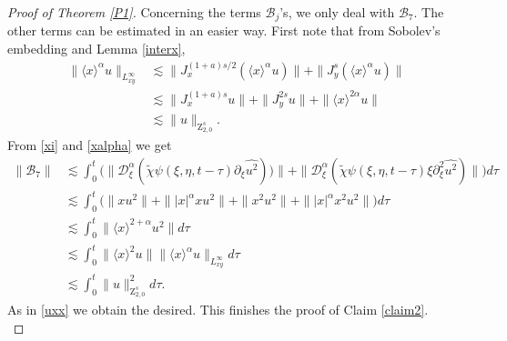 \documentclass[reqno]{amsart}
\newcommand{\les}{\lesssim}
\newcommand{\lanx}{\langle x \rangle}
\newcommand{\ti}{\tilde {\chi}}
\newcommand{\Dta}{\mathcal{D}^{\alpha}_\xi}
\newcommand{\p}{\partial}
\numberwithin{equation}{section}
\begin{document}
\begin{proof}[Proof of Theorem \ref{P1}]
Concerning the terms $\mathcal {B}_j$'s, we only deal with $\mathcal B_7$. The other terms can be estimated in an easier way. First note that from Sobolev's embedding and Lemma \ref{interx},
\begin{equation}
\begin{split}\label{xalpha}
\|\lanx^\alpha u\|_{L^\infty_{xy}}&\les \|J_x^{(1+a)s/2}(\lanx^\alpha u)\|+\|J_y^{s}(\lanx^\alpha u)\|\\
&\les \|J_x^{(1+a)s}u\|+\|J_y^{2s}u\|+\|\lanx^{2\alpha}u\|\\
&\les \|u\|_{\mathrm{Z}_{2,0}^s }.
\end{split}
\end{equation}
From \eqref{xi} and \eqref{xalpha} we get
\begin{equation*}
\begin{split}
\|\mathcal {B}_7\|&\les \int_0^t\Big(\|\Dta (\ti\psi(\xi,\eta, t-\tau)\p_\xi \widehat{u^2}))\|+\|\Dta (\ti\psi(\xi,\eta, t-\tau)\xi\p_\xi^2 \widehat{u^2})\|\Big)d\tau\\
&\les \int_0^t\big(\|x u^2\|+\||x|^\alpha xu^2\|+\|x^2 u^2\|+\||x|^\alpha x^2u^2\|\big)d \tau\\
&\lesssim\int_0^t \|\lanx^{2+\alpha}u^2\|d \tau\\
 &\les\int_0^t\|\lanx^2 u\|\|\lanx^\alpha u\|_{L^\infty_{xy}}d \tau\\
 &\les\int_0^t\|u\|_{\mathrm{Z}_{2,0}^s }^2d \tau.
\end{split}
\end{equation*}
As in \eqref{uxx} we obtain the desired. This finishes the proof of Claim \ref{claim2}.\\





\end{proof}
\end{document}
